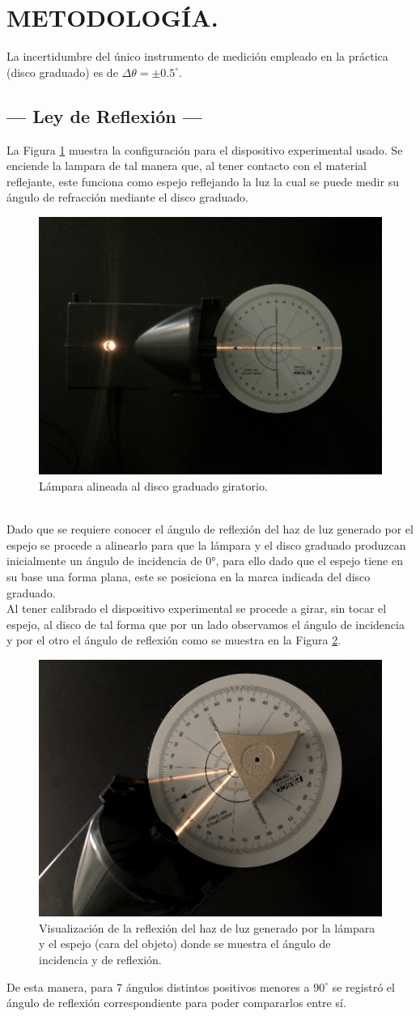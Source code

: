 \documentclass[12pt,a4paper]{article}
\begin{document}

\newpage

\section{METODOLOGÍA.} %
La incertidumbre del único instrumento de medición empleado en la práctica (disco graduado) es de $\Delta \theta=\pm 0.5^{\circ}$.
\subsection{--- Ley de Reflexión ---} %
\label{sub:ley_refl_metodo}
La Figura \ref{fig:dispositivo} muestra la configuración para el dispositivo experimental usado.  Se enciende la lampara de tal manera que, al tener contacto con el material reflejante, este funciona como espejo reflejando la luz la cual se puede medir su ángulo de refracción mediante el disco graduado.
\begin{figure}[ht]
	\centering
	\includegraphics[width= 0.4 \linewidth]{IMAGENES/METODOLOGÍA/image_1}
	\caption{Lámpara alineada al disco graduado giratorio.}
	\label{fig:dispositivo}
\end{figure}\\
Dado que se requiere conocer el ángulo de reflexión del haz de luz generado por el espejo se procede a alinearlo para que la lámpara y el disco graduado produzcan inicialmente un ángulo de incidencia de 0°, para ello dado que el espejo tiene en su base una forma plana, este se posiciona en la marca indicada del disco graduado. \\[2mm]
Al tener calibrado el dispositivo experimental se procede a girar, sin tocar el espejo, al disco de tal forma que por un lado observamos el ángulo de incidencia y por el otro el ángulo de reflexión como se muestra en la Figura \ref{fig:foto_reflexion}.\\[-3mm]
\begin{figure}[ht]
	\centering
	\includegraphics[width= 0.4 \linewidth]{IMAGENES/METODOLOGÍA/image_2}
	\caption{Visualización de la reflexión del haz de luz generado por la lámpara y el espejo (cara del objeto) donde se muestra el ángulo de incidencia y de reflexión.}
	\label{fig:foto_reflexion}
\end{figure}
\newpage
De esta manera, para 7 ángulos distintos positivos menores a \(90^ \circ\) se registró el ángulo de reflexión correspondiente para poder compararlos entre sí.
\end{document}
